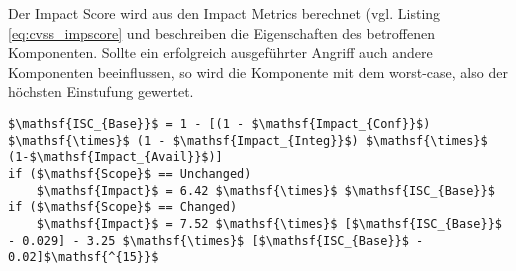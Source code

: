     \noindent Der Impact Score wird aus den Impact Metrics berechnet (vgl. Listing \ref{eq:cvss_impscore} und beschreiben die Eigenschaften des betroffenen Komponenten. 
    Sollte ein erfolgreich ausgeführter Angriff auch andere Komponenten beeinflussen, so wird die Komponente mit dem worst-case, also der höchsten Einstufung gewertet.
    \smallskip\\
    \begin{lstlisting}[caption={Berechnung des Impact Score \cite{CVSSspec}},label=eq:cvss_impscore,captionpos=b,mathescape=true]
$\mathsf{ISC_{Base}}$ = 1 - [(1 - $\mathsf{Impact_{Conf}}$) $\mathsf{\times}$ (1 - $\mathsf{Impact_{Integ}}$) $\mathsf{\times}$ (1-$\mathsf{Impact_{Avail}}$)]
if ($\mathsf{Scope}$ == Unchanged)
    $\mathsf{Impact}$ = 6.42 $\mathsf{\times}$ $\mathsf{ISC_{Base}}$
if ($\mathsf{Scope}$ == Changed)
    $\mathsf{Impact}$ = 7.52 $\mathsf{\times}$ [$\mathsf{ISC_{Base}}$ - 0.029] - 3.25 $\mathsf{\times}$ [$\mathsf{ISC_{Base}}$ - 0.02]$\mathsf{^{15}}$
    \end{lstlisting}
